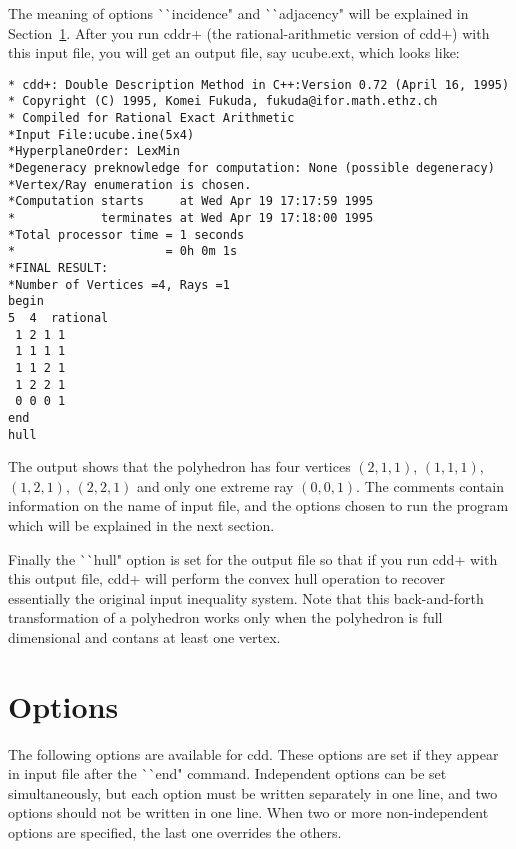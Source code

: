 The meaning of options ^^ ^^ incidence" and ^^ ^^ adjacency" 
will be explained in Section~\ref{OPTIONS}.
After you run cddr+ (the rational-arithmetic version of cdd+)  with this input file, you will get
an output file, say ucube.ext, which looks like:

\begin{verbatim}
* cdd+: Double Description Method in C++:Version 0.72 (April 16, 1995)
* Copyright (C) 1995, Komei Fukuda, fukuda@ifor.math.ethz.ch
* Compiled for Rational Exact Arithmetic
*Input File:ucube.ine(5x4)
*HyperplaneOrder: LexMin
*Degeneracy preknowledge for computation: None (possible degeneracy)
*Vertex/Ray enumeration is chosen.
*Computation starts     at Wed Apr 19 17:17:59 1995
*            terminates at Wed Apr 19 17:18:00 1995
*Total processor time = 1 seconds
*                     = 0h 0m 1s
*FINAL RESULT:
*Number of Vertices =4, Rays =1
begin
5  4  rational
 1 2 1 1
 1 1 1 1
 1 1 2 1
 1 2 2 1
 0 0 0 1
end
hull
\end{verbatim}

The output shows that the polyhedron has four vertices
$(2,1,1)$, $(1,1,1)$, $(1,2,1)$, $(2,2,1)$ and
only one extreme ray $(0,0,1)$.  The comments contain
information on the name of input file, and the options
chosen to run the program which will be explained in
the next section.  

Finally the ^^ ^^ hull" option is  set for
the output file so that if you run cdd+ with this output file,
cdd+ will perform the convex hull operation to recover 
essentially the original input inequality system.  Note that
this back-and-forth transformation of a polyhedron works
only when the polyhedron is full dimensional and contans
at least one vertex.

\section{Options}  \label{OPTIONS}

The following options are available for cdd.  These options are
set if they appear in input file after the ^^ ^^ end" command.
Independent options can be set simultaneously, but each option
must be written separately in one line, and  two options
should not be written in one line.  When two or more non-independent
options are specified, the last one overrides the others.

